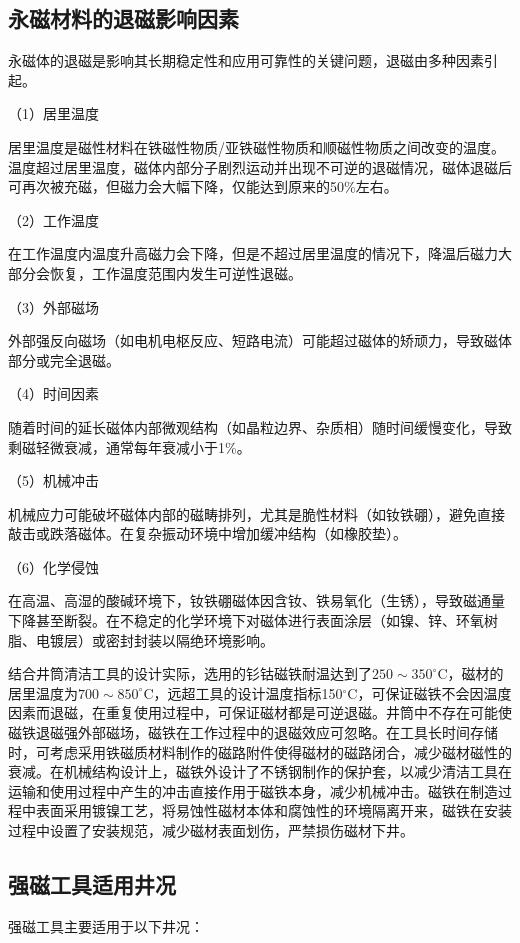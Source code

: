 \subsection{永磁材料的退磁影响因素}

永磁体的退磁是影响其长期稳定性和应用可靠性的关键问题，退磁由多种因素引起。

（1）居里温度

居里温度是磁性材料在铁磁性物质/亚铁磁性物质和顺磁性物质之间改变的温度。温度超过居里温度，磁体内部分子剧烈运动并出现不可逆的退磁情况，磁体退磁后可再次被充磁，但磁力会大幅下降，仅能达到原来的50\%左右。

（2）工作温度

在工作温度内温度升高磁力会下降，但是不超过居里温度的情况下，降温后磁力大部分会恢复，工作温度范围内发生可逆性退磁。

（3）外部磁场

外部强反向磁场（如电机电枢反应、短路电流）可能超过磁体的矫顽力，导致磁体部分或完全退磁。

（4）时间因素

随着时间的延长磁体内部微观结构（如晶粒边界、杂质相）随时间缓慢变化，导致剩磁轻微衰减，通常每年衰减小于1\%。

（5）机械冲击

机械应力可能破坏磁体内部的磁畴排列，尤其是脆性材料（如钕铁硼），避免直接敲击或跌落磁体。在复杂振动环境中增加缓冲结构（如橡胶垫）。

（6）化学侵蚀

在高温、高湿的酸碱环境下，钕铁硼磁体因含钕、铁易氧化（生锈），导致磁通量下降甚至断裂。在不稳定的化学环境下对磁体进行表面涂层（如镍、锌、环氧树脂、电镀层）或密封封装以隔绝环境影响。

结合井筒清洁工具的设计实际，选用的钐钴磁铁耐温达到了$250\sim 350^\circ$C，磁材的居里温度为$700\sim 850^\circ$C，远超工具的设计温度指标150$^\circ$C，可保证磁铁不会因温度因素而退磁，在重复使用过程中，可保证磁材都是可逆退磁。井筒中不存在可能使磁铁退磁强外部磁场，磁铁在工作过程中的退磁效应可忽略。在工具长时间存储时，可考虑采用铁磁质材料制作的磁路附件使得磁材的磁路闭合，减少磁材磁性的衰减。在机械结构设计上，磁铁外设计了不锈钢制作的保护套，以减少清洁工具在运输和使用过程中产生的冲击直接作用于磁铁本身，减少机械冲击。磁铁在制造过程中表面采用镀镍工艺，将易蚀性磁材本体和腐蚀性的环境隔离开来，磁铁在安装过程中设置了安装规范，减少磁材表面划伤，严禁损伤磁材下井。

\subsection{强磁工具适用井况}
强磁工具主要适用于以下井况：

